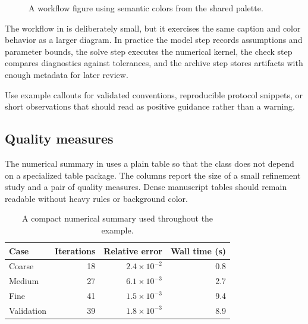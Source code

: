 \documentclass[\oritoneexamplemode,11pt]{oritone-manuscript}
\begin{document}
\begin{figure}[tbp]
  \centering
  \caption{A workflow figure using semantic colors from the shared palette.}
  \label{fig:workflow}
\end{figure}

The workflow in  is deliberately small, but it exercises the
same caption and color behavior as a larger diagram. In practice the model step
records assumptions and parameter bounds, the solve step executes the numerical
kernel, the check step compares diagnostics against tolerances, and the archive
step stores artifacts with enough metadata for later review.

\begin{oritoneexample}
Use example callouts for validated conventions, reproducible protocol snippets,
or short observations that should read as positive guidance rather than a
warning.
\end{oritoneexample}

\subsection{Quality measures}

The numerical summary in  uses a plain table so that the class
does not depend on a specialized table package. The columns report the size of a
small refinement study and a pair of quality measures. Dense manuscript tables
should remain readable without heavy rules or background color.

\begin{table}[tbp]
  \centering
  \caption{A compact numerical summary used throughout the example.}
  \label{tab:summary}
  \begin{tabular}{lrrr}
    \hline
    Case & Iterations & Relative error & Wall time (s) \\
    \hline
    Coarse & 18 & \(2.4\times10^{-2}\) & 0.8 \\
    Medium & 27 & \(6.1\times10^{-3}\) & 2.7 \\
    Fine & 41 & \(1.5\times10^{-3}\) & 9.4 \\
    Validation & 39 & \(1.8\times10^{-3}\) & 8.9 \\
    \hline
  \end{tabular}
\end{table}
\end{document}
